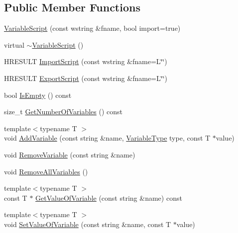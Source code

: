 \subsection*{Public Member Functions}
\begin{DoxyCompactItemize}
\item 
\hyperlink{classmage_1_1_variable_script_a4b4028a9710fcfc5fb26bb63922a90cb}{Variable\+Script} (const wstring \&fname, bool import=true)
\item 
virtual \hyperlink{classmage_1_1_variable_script_ae7026e1283b1a1164f02fdc3e1f2b829}{$\sim$\+Variable\+Script} ()
\item 
H\+R\+E\+S\+U\+LT \hyperlink{classmage_1_1_variable_script_aecdf36fb3068b0f00bec9bf29fe7bb25}{Import\+Script} (const wstring \&fname=L\char`\"{}\char`\"{})
\item 
H\+R\+E\+S\+U\+LT \hyperlink{classmage_1_1_variable_script_afd735406842c7df4ccb0bc96ae9935da}{Export\+Script} (const wstring \&fname=L\char`\"{}\char`\"{})
\item 
bool \hyperlink{classmage_1_1_variable_script_a8ae619cdc5519a753780360abab87430}{Is\+Empty} () const
\item 
size\+\_\+t \hyperlink{classmage_1_1_variable_script_ad0bcb7dbb42f705f475c64feb1063fb4}{Get\+Number\+Of\+Variables} () const
\item 
{\footnotesize template$<$typename T $>$ }\\void \hyperlink{classmage_1_1_variable_script_aa9a8bb9b6133ce853052820961320ca9}{Add\+Variable} (const string \&name, \hyperlink{namespacemage_a530428e73bac0ba7fe84b29086a9e33a}{Variable\+Type} type, const T $\ast$value)
\item 
void \hyperlink{classmage_1_1_variable_script_a4970ef4faafb1a6a43c4648ec9f36cce}{Remove\+Variable} (const string \&name)
\item 
void \hyperlink{classmage_1_1_variable_script_ac9575fb5f2ca445d9bcf23b63d00124e}{Remove\+All\+Variables} ()
\item 
{\footnotesize template$<$typename T $>$ }\\const T $\ast$ \hyperlink{classmage_1_1_variable_script_a231b83e1e32b882489ed90faa69f7137}{Get\+Value\+Of\+Variable} (const string \&name) const
\item 
{\footnotesize template$<$typename T $>$ }\\void \hyperlink{classmage_1_1_variable_script_a1b6daa6b226e43564408ab54e4c65eb7}{Set\+Value\+Of\+Variable} (const string \&name, const T $\ast$value)
\end{DoxyCompactItemize}
